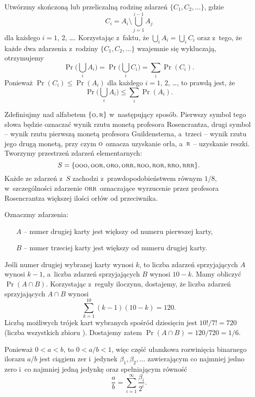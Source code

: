 
\exercise %
Utwórzmy skończoną lub przeliczalną rodzinę zdarzeń $\{C_1,C_2,\dots\}$, gdzie
\[
	C_i = A_i\setminus\bigcup_{j=1}^{i-1}A_j
\]
dla każdego $i=1$, 2, \dots.
Korzystając z~faktu, że $\bigcup_iA_i = \bigcup_iC_i$ oraz z~tego, że każde dwa zdarzenia z~rodziny $\{C_1,C_2,\dots\}$ wzajemnie się wykluczają, otrzymujemy
\[
	\Pr\biggl(\bigcup_iA_i\biggr) = \Pr\biggl(\bigcup_iC_i\biggr) = \sum_i\Pr(C_i).
\]
Ponieważ $\Pr(C_i)\le\Pr(A_i)$ dla każdego $i=1$, 2, \dots, to prawdą jest, że
\[
	\Pr\biggl(\bigcup_iA_i\biggr) \le \sum_i\Pr(A_i).
\]

\exercise %
Zdefiniujmy  nad alfabetem $\{{\scriptstyle\rm O},{\scriptstyle\rm R}\}$ w~następujący sposób.
Pierwszy symbol tego słowa będzie oznaczać wynik rzutu monetą profesora Rosencrantza, drugi symbol -- wynik rzutu pierwszą monetą profesora Guildensterna, a~trzeci -- wynik rzutu jego drugą monetą, przy czym $\scriptstyle\rm O$ oznacza uzyskanie orła, a~$\scriptstyle\rm R$ -- uzyskanie reszki.
Tworzymy przestrzeń zdarzeń elementarnych:
\[
	S = \{{\scriptstyle\rm OOO},{\scriptstyle\rm OOR},{\scriptstyle\rm ORO},{\scriptstyle\rm ORR},{\scriptstyle\rm ROO},{\scriptstyle\rm ROR},{\scriptstyle\rm RRO},{\scriptstyle\rm RRR}\}.
\]
Każde ze zdarzeń z~$S$ zachodzi z~prawdopodobieństwem równym $1/8$, w~szczególności zdarzenie $\scriptstyle\rm ORR$ oznaczające wyrzucenie przez profesora Rosencrantza większej ilości orłów od przeciwnika.

\exercise %
Oznaczmy zdarzenia:
\begin{itemize}
	\item[$A$] -- numer drugiej karty jest większy od numeru pierwszej karty,
	\item[$B$] -- numer trzeciej karty jest większy od numeru drugiej karty.
\end{itemize}
Jeśli numer drugiej wybranej karty wynosi $k$, to liczba zdarzeń sprzyjających $A$ wynosi $k-1$, a~liczba zdarzeń sprzyjających $B$ wynosi $10-k$.
Mamy obliczyć $\Pr(A\cap B)$.
Korzystając z~reguły iloczynu, dostajemy, że liczba zdarzeń sprzyjających $A\cap B$ wynosi
\[
    \sum_{k=1}^{10}(k-1)(10-k) = 120.
\]
Liczbą możliwych trójek kart wybranych spośród dziesięciu jest $10!/7!=720$ (liczba wszystkich  zbioru ).
Dostajemy zatem $\Pr(A\cap B)=120/720=1/6$.

\exercise %
Ponieważ $0<a<b$, to $0<a/b<1$, więc część ułamkowa rozwinięcia binarnego ilorazu $a/b$ jest ciągiem zer i~jedynek $\beta_1,\beta_2,\dots$ zawierającym co najmniej jedno zero i~co najmniej jedną jedynkę oraz spełniającym równość
\[
    \frac{a}{b} = \sum_{i=1}^\infty\frac{\beta_i}{2^i}.
\]

